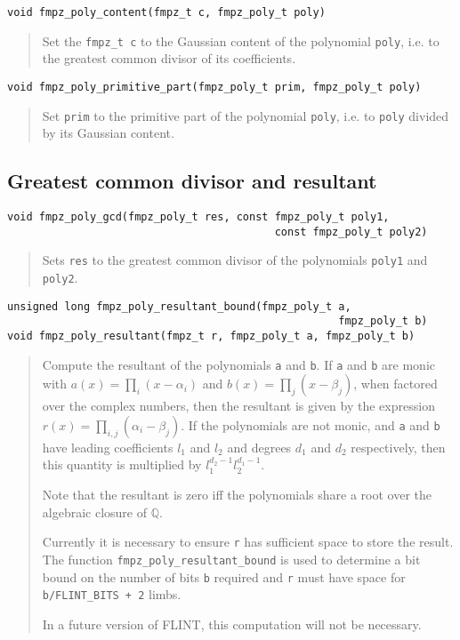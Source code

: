 \documentclass[a4paper,10pt]{article}
\newcommand{\Q}{\mathbb{Q}}
\newcommand{\code}{\lstinline}
\begin{document}
\begin{lstlisting}
void fmpz_poly_content(fmpz_t c, fmpz_poly_t poly)
\end{lstlisting}
\begin{quote}
Set the \code{fmpz_t c} to the Gaussian content of the polynomial \code{poly}, i.e. to the greatest common divisor of its coefficients.
\end{quote}

\begin{lstlisting}
void fmpz_poly_primitive_part(fmpz_poly_t prim, fmpz_poly_t poly)
\end{lstlisting}
\begin{quote}
Set \code{prim} to the primitive part of the polynomial \code{poly}, i.e. to \code{poly} divided by its Gaussian content.
\end{quote}

\subsection{Greatest common divisor and resultant}
\begin{lstlisting}
void fmpz_poly_gcd(fmpz_poly_t res, const fmpz_poly_t poly1, 
                                          const fmpz_poly_t poly2)
\end{lstlisting}
\begin{quote}
Sets \code{res} to the greatest common divisor of the polynomials \code{poly1} and \code{poly2}.
\end{quote}

\begin{lstlisting}
unsigned long fmpz_poly_resultant_bound(fmpz_poly_t a, 
                                                    fmpz_poly_t b)
void fmpz_poly_resultant(fmpz_t r, fmpz_poly_t a, fmpz_poly_t b)
\end{lstlisting}
\begin{quote}
Compute the resultant of the polynomials \code{a} and \code{b}. If \code{a} and \code{b} are monic with $a(x) = \prod_i (x - \alpha_i)$ and $b(x) = \prod_j (x - \beta_j)$, when factored over the complex numbers, then the resultant is given by the expression $r(x) = \prod_{i,j} (\alpha_i - \beta_j)$. If the polynomials are not monic, and \code{a} and \code{b} have leading coefficients $l_1$ and $l_2$ and degrees $d_1$ and $d_2$ respectively, then this quantity is multiplied by $l_1^{d_2-1}l_2^{d_1-1}$.

Note that the resultant is zero iff the polynomials share a root over the algebraic closure of $\Q$.

Currently it is necessary to ensure \code{r} has sufficient space to store the result. The function \code{fmpz_poly_resultant_bound} is used to determine a bit bound on the number of bits \code{b} required and \code{r} must have space for \code{b/FLINT_BITS + 2} limbs.

In a future version of FLINT, this computation will not be necessary.
\end{quote}
\end{document}
